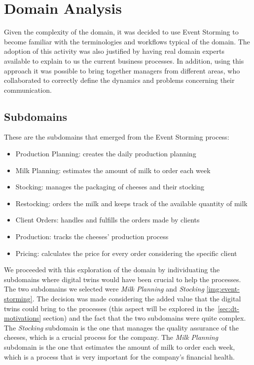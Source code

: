 \chapter{Domain Analysis}
Given the complexity of the domain, it was decided to use Event Storming to become familiar with the terminologies and workflows typical of the domain. The adoption of this activity was also justified by having real domain experts available to explain to us the current business processes. In addition, using this approach it was possible to bring together managers from different areas, who collaborated to correctly define the dynamics and problems concerning their communication.

\section{Subdomains}
These are the subdomains that emerged from the Event Storming process:
\begin{itemize}
	\item Production Planning: creates the daily production planning
	\item Milk Planning: estimates the amount of milk to order each week
	\item Stocking: manages the packaging of cheeses and their stocking
	\item Restocking: orders the milk and keeps track of the available quantity of milk
	\item Client Orders: handles and fulfills the orders made by clients
	\item Production: tracks the cheeses' production process
	\item Pricing: calculates the price for every order considering the specific client
\end{itemize}

We proceeded with this exploration of the domain by individuating the subdomains where digital twins would have been crucial to help the processes.
The two subdomains we selected were \textit{Milk Planning} and \textit{Stocking} \ref{img:event-storming}.
The decision was made considering the added value that the digital twins could bring to the processes (this aspect will be explored in the~\ref{sec:dt-motivations} section) and the fact that the two subdomains were quite complex.
The \textit{Stocking} subdomain is the one that manages the quality assurance of the cheeses, which is a crucial process for the company.
The \textit{Milk Planning} subdomain is the one that estimates the amount of milk to order each week, which is a process that is very important for the company's financial health.

